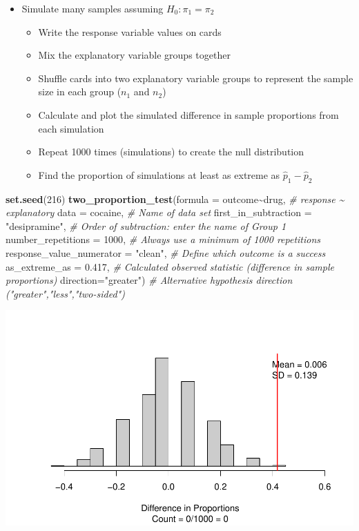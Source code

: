 \documentclass[
]{report}
\newenvironment{Shaded}{\begin{snugshade}}{\end{snugshade}}
\newcommand{\AttributeTok}[1]{\textcolor[rgb]{0.13,0.29,0.53}{#1}}
\newcommand{\CommentTok}[1]{\textcolor[rgb]{0.56,0.35,0.01}{\textit{#1}}}
\newcommand{\DecValTok}[1]{\textcolor[rgb]{0.00,0.00,0.81}{#1}}
\newcommand{\FloatTok}[1]{\textcolor[rgb]{0.00,0.00,0.81}{#1}}
\newcommand{\FunctionTok}[1]{\textcolor[rgb]{0.13,0.29,0.53}{\textbf{#1}}}
\newcommand{\NormalTok}[1]{#1}
\newcommand{\SpecialCharTok}[1]{\textcolor[rgb]{0.81,0.36,0.00}{\textbf{#1}}}
\newcommand{\StringTok}[1]{\textcolor[rgb]{0.31,0.60,0.02}{#1}}
\begin{document}
\begin{itemize}
\item
  Simulate many samples assuming \(H_0: \pi_1 = \pi_2\)

  \begin{itemize}
  \item
    Write the response variable values on cards
  \item
    Mix the explanatory variable groups together
  \item
    Shuffle cards into two explanatory variable groups to represent the sample size in each group (\(n_1\) and \(n_2\))
  \item
    Calculate and plot the simulated difference in sample proportions from each simulation
  \item
    Repeat 1000 times (simulations) to create the null distribution
  \item
    Find the proportion of simulations at least as extreme as \(\hat{p}_1 - \hat{p}_2\)
  \end{itemize}
\end{itemize}

\newpage

\begin{Shaded}
\begin{Highlighting}[]
\FunctionTok{set.seed}\NormalTok{(}\DecValTok{216}\NormalTok{)}
\FunctionTok{two\_proportion\_test}\NormalTok{(}\AttributeTok{formula =}\NormalTok{ outcome}\SpecialCharTok{\textasciitilde{}}\NormalTok{drug, }\CommentTok{\# response \textasciitilde{} explanatory}
    \AttributeTok{data =}\NormalTok{ cocaine, }\CommentTok{\# Name of data set}
    \AttributeTok{first\_in\_subtraction =} \StringTok{"desipramine"}\NormalTok{, }\CommentTok{\# Order of subtraction: enter the name of Group 1}
    \AttributeTok{number\_repetitions =} \DecValTok{1000}\NormalTok{, }\CommentTok{\# Always use a minimum of 1000 repetitions}
    \AttributeTok{response\_value\_numerator =} \StringTok{"clean"}\NormalTok{, }\CommentTok{\# Define which outcome is a success}
    \AttributeTok{as\_extreme\_as =} \FloatTok{0.417}\NormalTok{, }\CommentTok{\# Calculated observed statistic (difference in sample proportions)}
    \AttributeTok{direction=}\StringTok{"greater"}\NormalTok{) }\CommentTok{\# Alternative hypothesis direction ("greater","less","two{-}sided")}
\end{Highlighting}
\end{Shaded}

\begin{center}\includegraphics[width=0.7\linewidth]{08-LN09-two-cat-simulation_files/figure-latex/unnamed-chunk-4-1} \end{center}
\end{document}
